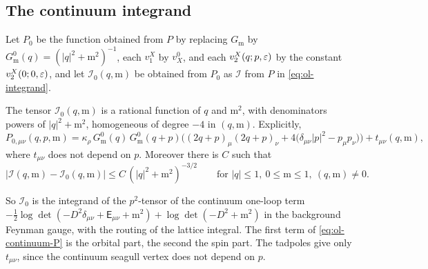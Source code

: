 \subsection{The continuum integrand}\label{ss:57.4}

Let $P_0$ be the function obtained from $P$ by replacing $G_{\mathrm m}$ by $G^0_{\mathrm m}(q)=(|q|^2+\mathrm m^2)^{-1}$, each $v_1^X$ by $v^0_X$, and each $v_2^X(q;p,\varepsilon)$ by the constant $v_2^X(0;0,\varepsilon)$, and let $\mathcal I_0(q,\mathrm m)$ be obtained from $P_0$ as $\mathcal I$ from $P$ in \eqref{eq:ol-integrand}.

\begin{lemma}\label{lem:ol-continuum-integrand}
The tensor $\mathcal I_0(q,\mathrm m)$ is a rational function of $q$ and $\mathrm m^2$, with denominators powers of $|q|^2+\mathrm m^2$, homogeneous of degree $-4$ in $(q,\mathrm m)$. Explicitly,
\begin{equation}\label{eq:ol-continuum-P}
P_{0,\mu\nu}(q,p,\mathrm m)=\kappa_\rho\,G^0_{\mathrm m}(q)\,G^0_{\mathrm m}(q+p)\Big((2q+p)_\mu(2q+p)_\nu+4\big(\delta_{\mu\nu}|p|^2-p_\mu p_\nu\big)\Big)+t_{\mu\nu}(q,\mathrm m),
\end{equation}
where $t_{\mu\nu}$ does not depend on $p$. Moreover there is $C$ such that
\[
|\mathcal I(q,\mathrm m)-\mathcal I_0(q,\mathrm m)|\le C\,(|q|^2+\mathrm m^2)^{-3/2}\qquad\text{for }|q|\le1,\ 0\le\mathrm m\le1,\ (q,\mathrm m)\ne0 .
\]
\end{lemma}

So $\mathcal I_0$ is the integrand of the $p^2$-tensor of the continuum one-loop term $-\frac12\log\det(-D^2\delta_{\mu\nu}+\mathsf E_{\mu\nu}+\mathrm m^2)+\log\det(-D^2+\mathrm m^2)$ in the background Feynman gauge, with the routing of the lattice integral. The first term of \eqref{eq:ol-continuum-P} is the orbital part, the second the spin part. The tadpoles give only $t_{\mu\nu}$, since the continuum seagull vertex does not depend on $p$.

